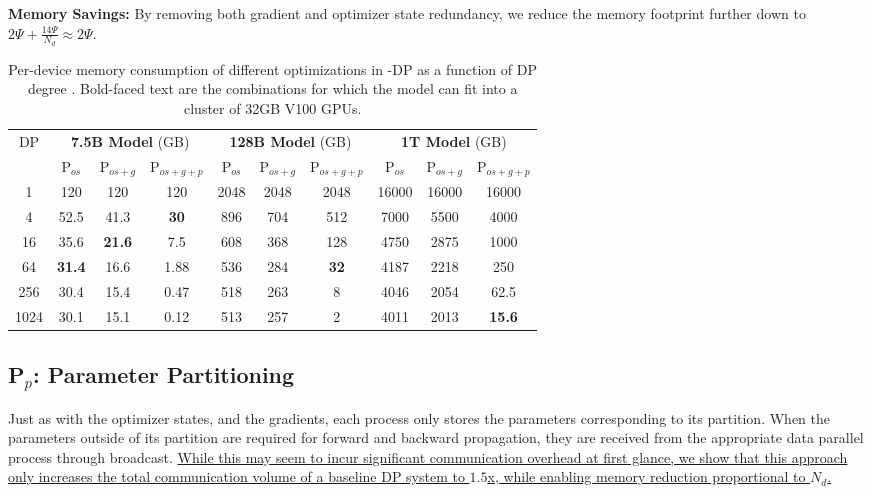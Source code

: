 \textbf{Memory Savings:} By removing both gradient and optimizer state redundancy, we reduce the memory footprint further down to \uline{$ 2 \Psi + \frac{14\Psi}{N_d} \approx 2 \Psi$}.

  \begin{table*}
        \centering
        \begin{tabular}{|c||c|c|c||c|c|c||c|c|c|}
        \hline
        \multicolumn{1}{|c}{\multirow{2}{*}{DP}}&\multicolumn{3}{||c}{\textbf{7.5B Model} (GB)} &\multicolumn{3}{||c}{\textbf{128B Model} (GB)} & \multicolumn{3}{||c|}{\textbf {1T Model} (GB)} \\
        \hhline{~---------}
        &P$_{os}$&P$_{os+g}$&P$_{os+g+p}$&P$_{os}$&P$_{os+g}$&P$_{os+g+p}$&P$_{os}$&P$_{os+g}$&P$_{os+g+p}$\\
        \hline
        1&120&120&120&2048&2048&2048&16000&16000&16000\\
        4&52.5&41.3&\textbf{30}&896&704&512&7000&5500&4000\\
        16&35.6&\textbf{21.6}&7.5&608&368&128&4750&2875&1000\\
        64&\textbf{31.4}&16.6&1.88&536&284&\textbf{32}&4187&2218&250\\
        256&30.4&15.4&0.47&518&263&8&4046&2054&62.5\\
        1024&30.1&15.1&0.12&513&257&2&4011&2013&\textbf{15.6}\\
        \hline
        \end{tabular}
     \caption{Per-device memory consumption of different optimizations in \name-DP as a function of DP degree . Bold-faced text are the combinations for which the model can fit into a cluster of 32GB V100 GPUs.}
     \label{tab:memory-consumption}
 \end{table*}

\subsection{P$_p$: Parameter Partitioning}\label{sec:pp}

Just as with the optimizer states, and the gradients, each process only stores the parameters corresponding to its partition. When the parameters outside of its partition are required for forward and backward propagation, they are received from the appropriate data parallel process through broadcast. \uline{While this may seem to incur significant communication overhead at first glance, we show that this approach only increases the total communication volume of a baseline DP system to $1.5$x, while enabling memory reduction proportional to $N_d$.}

